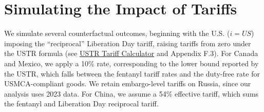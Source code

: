 \documentclass[12pt]{article}
\begin{document}
\section{Simulating the Impact of Tariffs}\label{sec: simulation}
We simulate several counterfactual outcomes, beginning with the U.S. ($i=US$) imposing the ``reciprocal'' Liberation Day tariff, raising tariffs from zero under the USTR formula (see \href{https://tariffs.inasimonovska.com/}{USTR Tariff Calculator} and Appendix F.3). 
For Canada and Mexico, we apply a 10\% rate, corresponding to the lower bound reported by the USTR, which falls between the fentanyl tariff rates and the duty-free rate for USMCA-compliant goods. We retain embargo-level tariffs on Russia, since our analysis uses 2023 data. For China, we assume a 54\% effective tariff, which sums the fentanyl and Liberation Day reciprocal tariff.%
%
\end{document}
